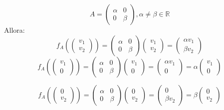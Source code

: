 \documentclass[a4paper]{article}
\theoremstyle{break}
\theoremstyle{break}
\theoremstyle{break}
\theoremstyle{break}
\begin{document}
\begin{example}
  \[
  A = \begin{pmatrix} 
    \alpha & 0\\
    0 & \beta
  \end{pmatrix} 
  , \alpha \neq \beta \in \mathbb{R}
  \] 
  Allora:
  \[
  f_A \left( \begin{pmatrix} v_1\\v_2 \end{pmatrix}  \right) = \begin{pmatrix} 
  \alpha & 0\\
  0 & \beta
\end{pmatrix} 
\begin{pmatrix} 
  v_1\\
  v_2
\end{pmatrix} 
  = \begin{pmatrix} 
    \alpha v_1\\
    \beta v_2
  \end{pmatrix} 
  \] 
  \vspace{1em}
  \[
  f_A \left( \begin{pmatrix} v_1\\0 \end{pmatrix}  \right) =
  \begin{pmatrix} 
    \alpha & 0\\
    0 & \beta
  \end{pmatrix} 
  \begin{pmatrix} 
    v_1\\
    0
  \end{pmatrix} 
  =
  \begin{pmatrix} 
    \alpha v_1\\
    0
  \end{pmatrix} 
  =
  \alpha
  \begin{pmatrix} 
    v_1\\
    0
  \end{pmatrix} 
  \] 

  \[
  f_A \left( \begin{pmatrix} 0\\v_2 \end{pmatrix}  \right) =
  \begin{pmatrix} 
    \alpha & 0\\
    0 & \beta
  \end{pmatrix}
  \begin{pmatrix} 
    0\\
    v_2
  \end{pmatrix}
  =
  \begin{pmatrix} 
    0\\
    \beta v_2
  \end{pmatrix} 
  =
  \beta \begin{pmatrix} 
    0\\
    v_2
  \end{pmatrix} 
  \] 
\end{example}
\end{document}
